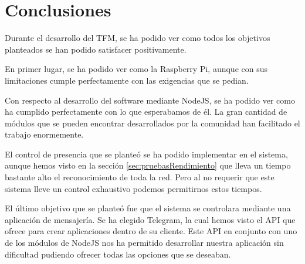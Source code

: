 \documentclass[10pt,journal,compsoc]{IEEEtran}
\begin{document}
\section{Conclusiones}
Durante el desarrollo del TFM, se ha podido ver como todos los objetivos 
planteados se han podido satisfacer positivamente.

En primer lugar, se ha podido ver como la Raspberry Pi, aunque con sus 
limitaciones cumple perfectamente con las exigencias que se pedian.

Con respecto al desarrollo del software mediante NodeJS, se ha podido ver como 
ha cumplido perfectamente con lo que esperabamos de él. La gran cantidad de 
módulos que se pueden encontrar desarrollados por la comunidad han facilitado el 
trabajo enormemente.

El control de presencia que se planteó se ha podido implementar en el sistema, 
aunque hemos visto en la sección \ref{sec:pruebasRendimiento} que lleva un 
tiempo bastante alto el reconocimiento de toda la red. Pero al no requerir que 
este sistema lleve un control exhaustivo podemos permitirnos estos tiempos.

El último objetivo que se planteó fue que el sistema se controlara mediante 
una aplicación de mensajería. Se ha elegido Telegram, la cual hemos visto el API 
que ofrece para crear aplicaciones dentro de su cliente. Este API en conjunto 
con uno de los módulos de NodeJS nos ha permitido desarrollar nuestra aplicación 
sin dificultad pudiendo ofrecer todas las opciones que se deseaban.
\end{document}
